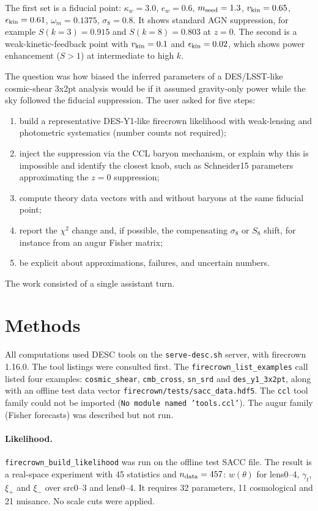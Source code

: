 \documentclass[11pt,a4paper]{article}
\begin{document}
The first set is a fiducial point: $\kappa_w=3.0$, $e_w=0.6$, $m_{\rm seed}=1.3$, $v_{\rm kin}=0.65$, $\epsilon_{\rm kin}=0.61$, $\omega_m=0.1375$, $\sigma_8=0.8$. It shows standard AGN suppression, for example $S(k=3)=0.915$ and $S(k=8)=0.803$ at $z=0$. The second is a weak-kinetic-feedback point with $v_{\rm kin}=0.1$ and $\epsilon_{\rm kin}=0.02$, which shows power enhancement ($S>1$) at intermediate to high $k$.

The question was how biased the inferred parameters of a DES/LSST-like cosmic-shear 3x2pt analysis would be if it assumed gravity-only power while the sky followed the fiducial suppression. The user asked for five steps:
\begin{enumerate}
\item build a representative DES-Y1-like firecrown likelihood with weak-lensing and photometric systematics (number counts not required);
\item inject the suppression via the CCL baryon mechanism, or explain why this is impossible and identify the closest knob, such as Schneider15 parameters approximating the $z=0$ suppression;
\item compute theory data vectors with and without baryons at the same fiducial point;
\item report the $\chi^2$ change and, if possible, the compensating $\sigma_8$ or $S_8$ shift, for instance from an augur Fisher matrix;
\item be explicit about approximations, failures, and uncertain numbers.
\end{enumerate}
The work consisted of a single assistant turn.

\section{Methods}
All computations used DESC tools on the \texttt{serve-desc.sh} server, with firecrown 1.16.0. The tool listings were consulted first. The \texttt{firecrown\_list\_examples} call listed four examples: \texttt{cosmic\_shear}, \texttt{cmb\_cross}, \texttt{sn\_srd} and \texttt{des\_y1\_3x2pt}, along with an offline test data vector \texttt{firecrown/tests/sacc\_data.hdf5}. The \texttt{ccl} tool family could not be imported (\texttt{No module named 'tools.ccl'}). The augur family (Fisher forecasts) was described but not run.

\paragraph{Likelihood.} \texttt{firecrown\_build\_likelihood} was run on the offline test SACC file. The result is a real-space experiment with 45 statistics and $n_{\rm data}=457$: $w(\theta)$ for lens0--4, $\gamma_t$, $\xi_+$ and $\xi_-$ over src0--3 and lens0--4. It requires 32 parameters, 11 cosmological and 21 nuisance. No scale cuts were applied.
\end{document}
